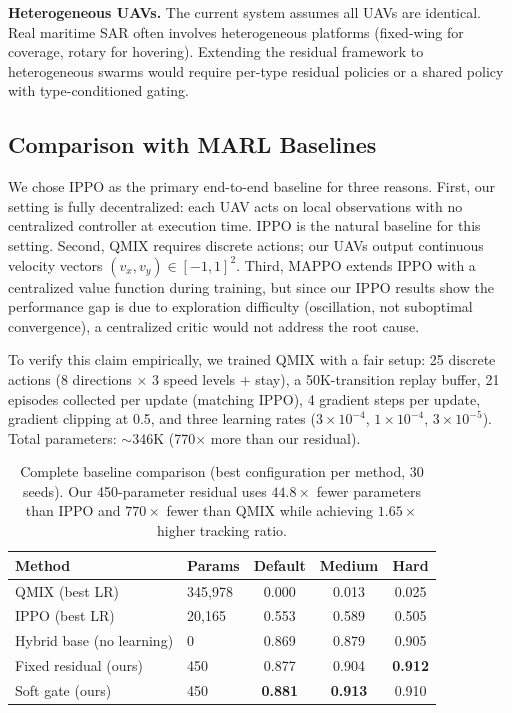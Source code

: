\documentclass[journal]{IEEEtran}
\begin{document}
\textbf{Heterogeneous UAVs.} The current system assumes all UAVs are identical. Real
maritime SAR often involves heterogeneous platforms (fixed-wing for coverage, rotary
for hovering). Extending the residual framework to heterogeneous swarms would require
per-type residual policies or a shared policy with type-conditioned gating.

\subsection{Comparison with MARL Baselines}\label{sec:marl_compare}

We chose IPPO as the primary end-to-end baseline for three reasons. First, our
setting is fully decentralized: each UAV acts on local observations with no
centralized controller at execution time. IPPO is the natural baseline for this
setting. Second, QMIX requires discrete actions; our UAVs output continuous velocity
vectors $(v_x, v_y) \in [-1,1]^2$. Third, MAPPO extends IPPO with a centralized
value function during training, but since our IPPO results show the performance gap
is due to exploration difficulty (oscillation, not suboptimal convergence), a
centralized critic would not address the root cause.

To verify this claim empirically, we trained QMIX with a fair setup: 25 discrete
actions (8 directions $\times$ 3 speed levels + stay), a 50K-transition replay buffer,
21 episodes collected per update (matching IPPO), 4 gradient steps per update, gradient
clipping at 0.5, and three learning rates ($3\times10^{-4}$, $1\times10^{-4}$,
$3\times10^{-5}$). Total parameters: $\sim$346K (770$\times$ more than our residual).

\begin{table}[t]
\centering
\caption{Complete baseline comparison (best configuration per method, 30 seeds).
Our 450-parameter residual uses $44.8\times$ fewer parameters than IPPO and
$770\times$ fewer than QMIX while achieving $1.65\times$ higher tracking ratio.}
\label{tab:marl_compare}
\scriptsize
\setlength{\tabcolsep}{3pt}
\begin{tabular}{@{}llccc@{}}
\toprule
Method & Params & Default & Medium & Hard \\
\midrule
QMIX (best LR)            & 345,978 & 0.000 & 0.013 & 0.025 \\
IPPO (best LR)            & 20,165  & 0.553 & 0.589 & 0.505 \\
\midrule
Hybrid base (no learning)  & 0      & 0.869 & 0.879 & 0.905 \\
Fixed residual (ours)      & 450    & 0.877 & 0.904 & \textbf{0.912} \\
Soft gate (ours)           & 450    & \textbf{0.881} & \textbf{0.913} & 0.910 \\
\bottomrule
\end{tabular}
\end{table}
\end{document}
